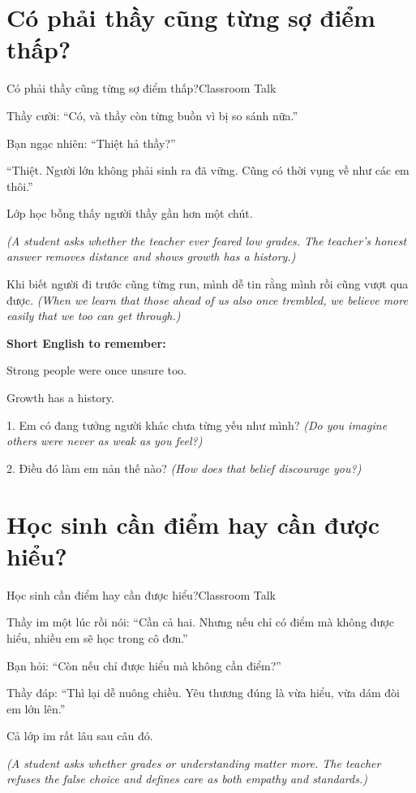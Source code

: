 \section{Có phải thầy cũng từng sợ điểm thấp?}
\begin{truyen}{Có phải thầy cũng từng sợ điểm thấp?}{Classroom Talk}

Thầy cười: ``Có, và thầy còn từng buồn vì bị so sánh nữa.''

Bạn ngạc nhiên: ``Thiệt hả thầy?''

``Thiệt. Người lớn không phải sinh ra đã vững. Cũng có thời vụng về như các em thôi.''

Lớp học bỗng thấy người thầy gần hơn một chút.

\textit{(A student asks whether the teacher ever feared low grades. The teacher's honest answer removes distance and shows growth has a history.)}
\end{truyen}

\begin{baihoc}
Khi biết người đi trước cũng từng run, mình dễ tin rằng mình rồi cũng vượt qua được.
\textit{(When we learn that those ahead of us also once trembled, we believe more easily that we too can get through.)}
\end{baihoc}

\begin{ghinhoanh}
\textbf{Short English to remember:}

Strong people were once unsure too.

Growth has a history.
\end{ghinhoanh}

\begin{tuhocnhanh}
1. Em có đang tưởng người khác chưa từng yếu như mình? \textit{(Do you imagine others were never as weak as you feel?)}

2. Điều đó làm em nản thế nào? \textit{(How does that belief discourage you?)}
\end{tuhocnhanh}
\ngancach

\section{Học sinh cần điểm hay cần được hiểu?}
\begin{truyen}{Học sinh cần điểm hay cần được hiểu?}{Classroom Talk}

Thầy im một lúc rồi nói: ``Cần cả hai. Nhưng nếu chỉ có điểm mà không được hiểu, nhiều em sẽ học trong cô đơn.''

Bạn hỏi: ``Còn nếu chỉ được hiểu mà không cần điểm?''

Thầy đáp: ``Thì lại dễ nuông chiều. Yêu thương đúng là vừa hiểu, vừa dám đòi em lớn lên.''

Cả lớp im rất lâu sau câu đó.

\textit{(A student asks whether grades or understanding matter more. The teacher refuses the false choice and defines care as both empathy and standards.)}
\end{truyen}

